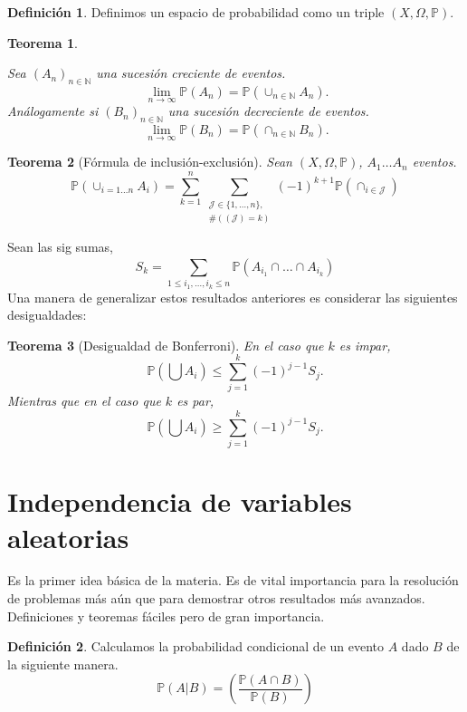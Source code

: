\documentclass[11pt]{article}
\theoremstyle{plain} %
\newtheorem{teorema}{\color{rojo}Teorema}
\theoremstyle{definition}
\newtheorem*{definicion}{Definici\'{o}n} %
\theoremstyle{remark}
\def\Om{\Omega}
\def\N{\mathbb{N}}
\def\P{\mathbb{P}}
\def\blue{\textcolor{blue!60!black}}
\begin{document}
\begin{definicion}
	Definimos un \blue{espacio de probabilidad} como un triple $\left( X,\Om,\mathbb P\right) $. 
\end{definicion}


\begin{teorema}
	\label{teo:contproba}
	
	Sea $(A_n)_{n \in \N}$ una sucesi\'on creciente de eventos.
	\[ \ \lim_{n \to \infty} \P(A_n) = \P(\cup_{n \in \N} A_n). \]
	An\'alogamente si $(B_n)_{n \in \N}$ una sucesi\'on decreciente de eventos.
	\[ \ \lim_{n \to \infty} \P(B_n) = \P(\cap_{n \in \N} B_n). \]
\end{teorema}

\begin{teorema}
	[F\'ormula de inclusi\'on-exclusi\'on]
	Sean $\left( X,\Om,\mathbb P\right) $, $A_1 \dots A_n$ eventos.
	\begin{equation*}
		\P \left( \cup_{i=1 \dots n} A_{i}\right)  = \sum_{k=1}^{n} \sum_{\substack{\mathcal{J}\in \{1,\dots,n\},\\\#(\mathcal{(J)} = k)}}	\left(-1 \right)^{k+1} \P\left( \cap_{i \in \mathcal J} \right)  		
	\end{equation*}
\end{teorema}

Sean las sig sumas,
\[
S_k = \sum_{1 \le i_1, \dots, i_k \le n }^{} \P (A_{i_1} \cap \dots \cap A_{i_k})
\]
Una manera de generalizar estos resultados anteriores es considerar las siguientes desigualdades:

\begin{teorema}
	[Desigualdad de Bonferroni] 
	En el caso que $k$ es impar,
	\[ 
	\P(\bigcup A_i) \le \sum_{j=1}^{k}(-1)^{j-1} S_j.
	\]	
	Mientras que en el caso que $k$ es par,
	\[
	\P(\bigcup A_i) \ge \sum_{j=1}^{k}(-1)^{j-1} S_j.
	\]
\end{teorema}
\bigskip

\section{Independencia de variables aleatorias}

Es la primer idea básica de la materia. Es de vital importancia para la resolución de problemas más aún que para demostrar otros resultados más avanzados. Definiciones y teoremas fáciles pero de gran importancia.

\begin{definicion}
	Calculamos la \blue{probabilidad condicional} de un evento $A$ dado $B$ de la siguiente manera.
	\[\P(A|B) = \left(\dfrac{\P(A\cap B)}{\P(B)} \right) \]
\end{definicion}
\end{document}
